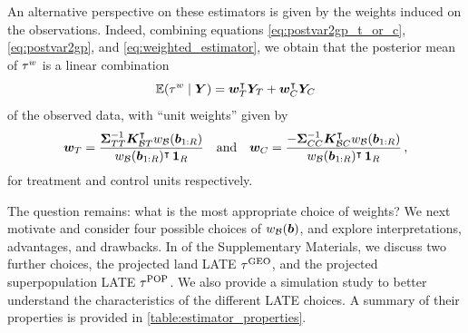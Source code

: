 An alternative perspective on these estimators is given by the weights induced on the observations.
Indeed, combining equations \autoref{eq:postvar2gp_t_or_c}, \autoref{eq:postvar2gp}, and \autoref{eq:weighted_estimator}, we obtain that the posterior mean of \(\tau^{w}\) is a linear combination
\begin{equation}
    \E\del{\tauw \mid \Yvec} = \wt\trans \yt + \wc\trans \yc
    \label{eq:unit_weights}
\end{equation}
of the observed data, with ``unit weights'' given by
\begin{equation}
        \bm{w}_{T} = \frac{
            \bm{\Sigma}_{T T}^{-1} 
            \bm{K}_{\mathcal{B} T}^{\intercal} w_{\mathcal{B}}(\bm{b}_{1:R})
        }{
            w_{\mathcal{B}}(\bm{b}_{1:R})^{\intercal} \operatorname{\mathbf{1}}_{R}
        }
        \quad\text{and}\quad
        \bm{w}_{C} = \frac{
            -
            \bm{\Sigma}_{C C}^{-1} 
            \bm{K}_{\mathcal{B} C}^{\intercal} w_{\mathcal{B}}(\bm{b}_{1:R})
        }{
            w_{\mathcal{B}}(\bm{b}_{1:R})^{\intercal} \operatorname{\mathbf{1}}_{R}
        }
        \,,
    \label{eq:unit_weights_gp}
\end{equation}
for treatment and control units respectively.

The question remains: what is the most appropriate choice of weights?
We next motivate and consider four possible choices of \(w_{\mathcal{B}}(\bm{b})\), and explore interpretations, advantages, and drawbacks. 
In  of the Supplementary Materials, we discuss two further choices, the projected land LATE \(\tau^{\mathrm{GEO}}\), and the projected superpopulation LATE \(\tau^{\mathrm{POP}}\).
We also provide a simulation study to better understand the characteristics of the different LATE choices.
A summary of their properties is provided in \autoref{table:estimator_properties}.

